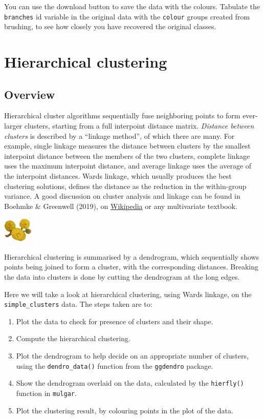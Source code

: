 \documentclass[
  letterpaper,
]{krantz}
\providecommand{\tightlist}{%
  \setlength{\itemsep}{0pt}\setlength{\parskip}{0pt}}\usepackage{longtable,booktabs,array}
\newcommand{\infobox}[1]{%
\noindent\colorbox{info!30}{%
\begin{minipage}{0.98\linewidth}%
    \centering%
    \begin{minipage}[c]{0.15\linewidth} %
      \includegraphics[width=1.5cm]{images/mulga-flowers2.png} %
    \end{minipage}%
    \hfill %
    \begin{minipage}[c]{0.8\linewidth} %
      \bigskip%
      \textsf{#1}%
      \bigskip%
    \end{minipage}%
    \hspace*{3mm}%
  \end{minipage}%
}%
}
\begin{document}
You can use the download button to save the data with the colours.
Tabulate the \texttt{branches} id variable in the original data with the
\texttt{colour} groups created from brushing, to see how closely you
have recovered the original classes.


\chapter{Hierarchical clustering}\label{sec-hclust}



\section{Overview}\label{overview}

Hierarchical cluster algorithms sequentially fuse neighboring points to
form ever-larger clusters, starting from a full interpoint distance
matrix. \emph{Distance between clusters} is described by a ``linkage
method'', of which there are many. For example, single linkage measures
the distance between clusters by the smallest interpoint distance
between the members of the two clusters, complete linkage uses the
maximum interpoint distance, and average linkage uses the average of the
interpoint distances. Wards linkage, which usually produces the best
clustering solutions, defines the distance as the reduction in the
within-group variance. A good discussion on cluster analysis and linkage
can be found in Boehmke \& Greenwell (2019), on
\href{https://en.wikipedia.org/wiki/Cluster_analysis}{Wikipedia} or any
multivariate textbook.

\infobox{Hierarchical clustering is summarised by a dendrogram, which sequentially shows points being joined to form a cluster, with the corresponding distances. Breaking the data into clusters is done by cutting the dendrogram at the long edges.}

Here we will take a look at hierarchical clustering, using Wards
linkage, on the \texttt{simple\_clusters} data. The steps taken are to:

\begin{enumerate}
\def\labelenumi{\arabic{enumi}.}
\tightlist
\item
  Plot the data to check for presence of clusters and their shape.
\item
  Compute the hierarchical clustering.
\item
  Plot the dendrogram to help decide on an appropriate number of
  clusters, using the \texttt{dendro\_data()} function from the
  \texttt{ggdendro} package.
\item
  Show the dendrogram overlaid on the data, calculated by the
  \texttt{hierfly()} function in \texttt{mulgar}.
\item
  Plot the clustering result, by colouring points in the plot of the
  data.
\end{enumerate}
\end{document}
